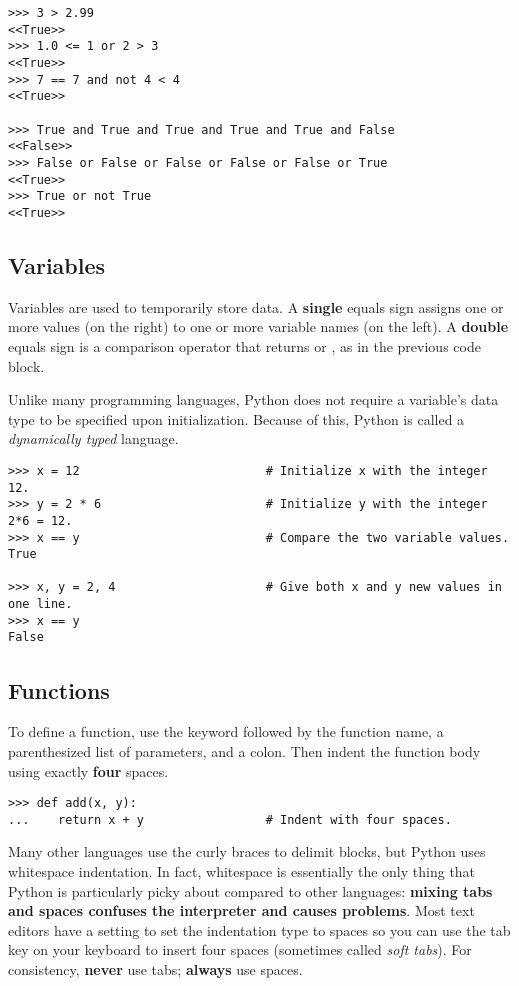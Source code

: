 \begin{lstlisting}
>>> 3 > 2.99
<<True>>
>>> 1.0 <= 1 or 2 > 3
<<True>>
>>> 7 == 7 and not 4 < 4
<<True>>

>>> True and True and True and True and True and False
<<False>>
>>> False or False or False or False or False or True
<<True>>
>>> True or not True
<<True>>
\end{lstlisting}

\subsection*{Variables} %

Variables are used to temporarily store data.
A \textbf{single} equals sign \li{=} assigns one or more values (on the right) to one or more variable names (on the left).
A \textbf{double} equals sign \li{==} is a comparison operator that returns  or , as in the previous code block.

Unlike many programming languages, Python does not require a variable's data type to be specified upon initialization.
Because of this, Python is called a \emph{dynamically typed} language.

\begin{lstlisting}
>>> x = 12                          # Initialize x with the integer 12.
>>> y = 2 * 6                       # Initialize y with the integer 2*6 = 12.
>>> x == y                          # Compare the two variable values.
True

>>> x, y = 2, 4                     # Give both x and y new values in one line.
>>> x == y
False
\end{lstlisting}

\subsection*{Functions} %

To define a function, use the  keyword followed by the function name, a parenthesized list of parameters, and a colon.
Then indent the function body using exactly \textbf{four} spaces.

\begin{lstlisting}
>>> def add(x, y):
...    return x + y                 # Indent with four spaces.
\end{lstlisting}

\begin{warn} %
Many other languages use the curly braces \li{\{\}} to delimit blocks, but Python uses whitespace indentation.
In fact, whitespace is essentially the only thing that Python is particularly picky about compared to other languages: \textbf{mixing tabs and spaces confuses the interpreter and causes problems}.
Most text editors have a setting to set the indentation type to spaces so you can use the tab key on your keyboard to insert four spaces (sometimes called \emph{soft tabs}).
For consistency, \textbf{never} use tabs; \textbf{always} use spaces.
\end{warn}

